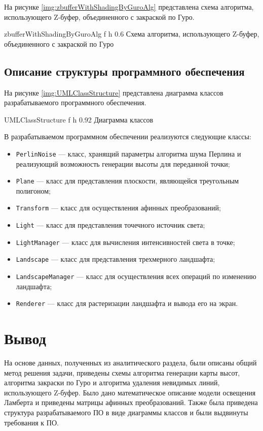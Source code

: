 На рисунке \ref{img:zbufferWithShadingByGuroAlg} представлена схема алгоритма, использующего Z-буфер, объединенного с закраской по Гуро.

{zbufferWithShadingByGuroAlg} %
{f} %
{h} %
{0.6\textwidth} %
{Схема алгоритма, использующего Z-буфер, объединенного с закраской по Гуро} %

\subsection{Описание структуры программного обеспечения}

На рисунке \ref{img:UMLClassStructure} представлена диаграмма классов разрабатываемого программного обеспечения.

{UMLClassStructure} %
{f} %
{h} %
{0.92\textwidth} %
{Диаграмма классов} %

\clearpage

В разрабатываемом программном обеспечении реализуются следующие классы: 

\begin{itemize}[label*=---]
	\item \texttt{PerlinNoise} --- класс, хранящий параметры алгоритма шума Перлина и реализующий возможность генерации высоты для переданной точки;
	\item \texttt{Plane} --- класс для представления плоскости, являющейся треугольным полигоном;
	\item \texttt{Transform} --- класс для осуществления афинных преобразований;
	\item \texttt{Light} --- класс  для представления точечного источник света;
	\item \texttt{LightManager} --- класс для вычисления интенсивностей света в точке;
	\item \texttt{Landscape} --- класс для представления трехмерного ландшафта;
	\item \texttt{LandscapeManager} --- класс для осуществления всех операций по изменению ландшафта;
	\item \texttt{Renderer} --- класс для растеризации ландшафта и вывода его на экран.
\end{itemize}

\section*{Вывод}

На основе данных, полученных из аналитического раздела, были описаны общий метод решения задачи, приведены схемы алгоритма генерации карты высот, алгоритма закраски по Гуро и алгоритма удаления невидимых линий, использующего Z-буфер. 
Было дано математическое описание модели освещения Ламберта и приведены матрицы афинных преобразований. 
Также была приведена структура разрабатываемого ПО в виде диаграммы классов и были выдвинуты требования к ПО.
